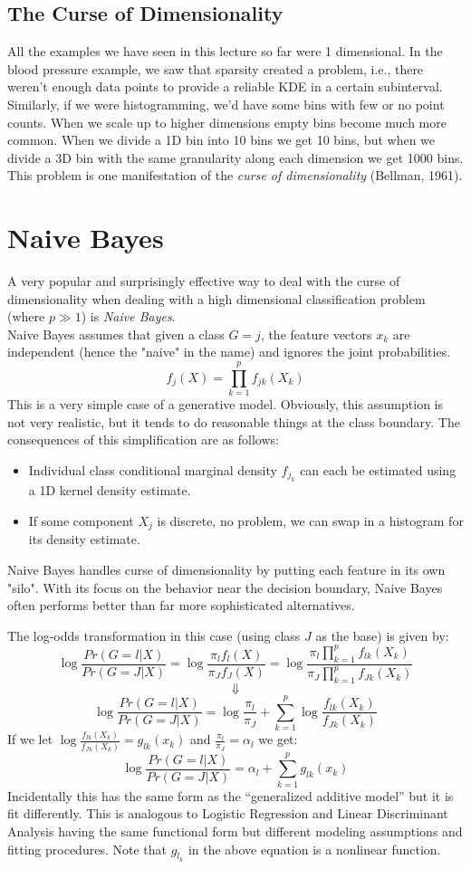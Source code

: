 \documentclass[a4paper]{article}
\begin{document}
\subsection{The Curse of Dimensionality}
All the examples we have seen in this lecture so far were 1 dimensional.  In the blood pressure example, we saw that sparsity created a problem, i.e., there weren't enough data points to provide a reliable KDE in a certain subinterval.  Similarly, if we were histogramming, we'd have some bins with few or no point counts.  When we scale up to higher dimensions empty bins become much more common.  When we divide a 1D bin into 10 bins we get 10 bins, but when we divide a 3D bin with the same granularity along each dimension we get 1000 bins.  This problem is one manifestation of the \textit{curse of dimensionality} (Bellman, 1961).

\section{Naive Bayes}
A very popular and surprisingly effective way to deal with the curse of dimensionality when dealing with a high dimensional classification problem (where $p\gg 1$) is \textit{Naive Bayes}.\\
Naive Bayes assumes that given a class $G=j$, the feature vectors $x_k$ are independent (hence the "naive" in the name) and ignores the joint probabilities.$$f_j(X)=\prod_{k=1}^p f_{jk}(X_k)$$
This is a very simple case of a generative model.  Obviously, this assumption is not very realistic, but it tends to do reasonable things at the class boundary. The consequences of this simplification are as follows:
\begin{itemize}
\item Individual class conditional marginal density $f_{j_k}$ can each be estimated using a 1D kernel density estimate.
\item If some component $X_j$ is discrete, no problem, we can swap in a histogram for its density estimate.
\end{itemize}
Naive Bayes handles curse of dimensionality by putting each feature in its own "silo". With its focus on the behavior near the decision boundary, Naive Bayes often performs better than far more sophisticated alternatives.

The log-odds transformation in this case (using class $J$ as the base) is given by:
$$\log \frac{Pr(G=l|X)}{Pr(G=J|X)}=\log \frac{\pi_l f_l (X)}{\pi_J f_J (X)}=\log \frac{\pi_l \prod_{k=1}^p f_{lk}(X_k)}{\pi_J \prod_{k=1}^p f_{Jk}(X_k)}$$
$$\Downarrow$$
$$\log \frac{Pr(G=l|X)}{Pr(G=J|X)}=\log \frac{\pi_l}{\pi_J} + \sum_{k=1}^p \log \frac{f_{lk}(X_k)}{f_{Jk}(X_k)}$$
If we let $\log \frac{f_{lk}(X_k)}{f_{Jk}(X_k)}=g_{lk}(x_k)$ and $\frac{\pi_l}{\pi_J}=\alpha_l$ we get:
$$\log \frac{Pr(G=l|X)}{Pr(G=J|X)}=\alpha_l + \sum_{k=1}^p g_{lk}(x_k)$$
Incidentally this has the same form as the ``generalized additive model'' but it is fit differently.  This is analogous to Logistic Regression and Linear Discriminant Analysis having the same functional form but different modeling assumptions and fitting procedures. Note that $g_{l_k}$ in the above equation is a nonlinear function. 
\end{document}
